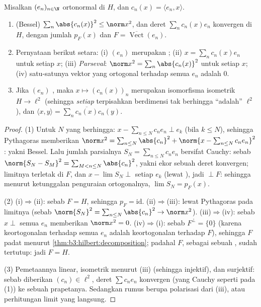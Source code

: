 \begin{theorem}\label{thm:b3:hilbert:parseval}
Misalkan $(e_n)_{n\in\N}$ ortonormal di $H$, dan $c_n(x) =
\langle e_n, x\rangle$.
\begin{enumerate}
  \item (Bessel) $\sum_n\abs{c_n(x)}^2 \leq \norm x^2$, dan
        deret $\sum_nc_n(x)e_n$ konvergen di $H$, dengan
        jumlah $p_F(x)$ dan $F = \overline{\operatorname{Vect}}(e_n)$.
  \item Pernyataan berikut setara: (i) $(e_n)$ merupakan ; (ii) $x = \sum_nc_n(x)e_n$ untuk setiap $x$; (iii)
        \emph{Parseval}: $\norm x^2
        = \sum_n\abs{c_n(x)}^2$ untuk setiap $x$; (iv) satu-satunya
        vektor yang ortogonal terhadap semua $e_n$ adalah $0$.
  \item Jika $(e_n)$ , maka $x \mapsto (c_n(x))_n$
        merupakan isomorfisma isometrik $H \to \ell^2$
        (sehingga \emph{setiap}  terpisahkan berdimensi
        tak berhingga ``adalah'' $\ell^2$), dan $\langle x, y\rangle =
        \sum_n\overline{c_n(x)}c_n(y)$.
\end{enumerate}
\end{theorem}

\begin{proof}
(1) Untuk $N$ yang berhingga: $x - \sum_{n\leq N}c_ne_n \perp e_k$ (bila $k
\leq N$), sehingga Pythagoras memberikan $\norm x^2 = \sum_{n\leq
N}\abs{c_n}^2 + \norm{x - \sum_{n\leq N}c_ne_n}^2$: yakni Bessel.
Lalu jumlah parsialnya $S_N = \sum_{n\leq N}c_ne_n$ bersifat Cauchy:
sebab $\norm{S_N - S_M}^2 = \sum_{M<n\leq N}\abs{c_n}^2$, yakni ekor sebuah
deret konvergen; limitnya terletak di $F$, dan $x - \lim S_N
\perp$ setiap $e_k$ (lewat ), jadi $\perp F$: sehingga menurut ketunggalan
penguraian ortogonalnya, $\lim S_N = p_F(x)$.

(2) (i)$\Rightarrow$(ii): sebab $F = H$, sehingga $p_F = \mathrm{id}$.
(ii)$\Rightarrow$(iii): lewat Pythagoras pada limitnya (sebab $\norm{S_N}^2
= \sum_{n \leq N}\abs{c_n}^2 \to \norm x^2$).
(iii)$\Rightarrow$(iv): sebab $x \perp$ semua $e_n$ memberikan $\norm x^2 =
0$. (iv)$\Rightarrow$(i): sebab $F^\perp = \{0\}$
(karena keortogonalan terhadap semua $e_n$ adalah keortogonalan terhadap $F$), sehingga $F$
padat menurut \cref{thm:b3:hilbert:decomposition}; padahal $F$, sebagai
sebuah , sudah tertutup: jadi $F = H$.

(3) Pemetaannya linear, isometrik menurut (iii) (sehingga injektif),
dan surjektif: sebab diberikan $(c_n) \in \ell^2$, deret $\sum
c_ne_n$ konvergen (yang Cauchy seperti pada (1)) ke sebuah prapetanya. Sedangkan rumus
 berupa polarisasi dari (iii), atau perhitungan limit
yang langsung.
\end{proof}

